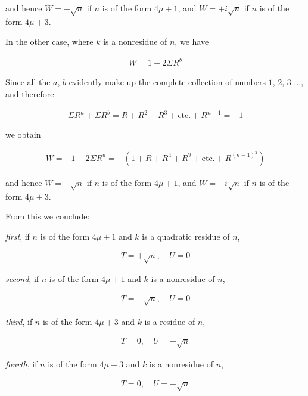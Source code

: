 and hence $W=+\surd n$ if $n$ is of the form $4\mu+1$, and $W=+i\surd n$ if $n$ is of the form $4\mu+3$.

In the other case, where $k$ is a nonresidue of $n$, we have

\[
\begin{aligned}
W=1+2\Sigma R^b
\end{aligned}
\]

Since all the $a$, $b$ evidently make up the complete collection of numbers $1$, $2$, $3$ $\ldots$, and therefore

\[
\begin{aligned}
\Sigma R^a+\Sigma R^b=R+R^2+R^3+\text{etc.}+R^{n-1}=-1
\end{aligned}
\]

we obtain

\[
\begin{aligned}
W=-1-2\Sigma R^a=-(1+R+R^4+R^9+\text{etc.}+R^{(n-1)^2})
\end{aligned}
\]

and hence $W=-\surd n$ if $n$ is of the form $4\mu+1$, and $W=-i\surd n$ if $n$ is of the form $4\mu+3$.

From this we conclude:

\emph{first}, if $n$ is of the form $4\mu+1$ and $k$ is a quadratic residue of $n$,

\[
\begin{aligned}
T=+\surd n,\quad U=0
\end{aligned}
\]

\emph{second}, if $n$ is of the form $4\mu+1$ and $k$ is a nonresidue of $n$,

\[
\begin{aligned}
T=-\surd n,\quad U=0
\end{aligned}
\]

\emph{third}, if $n$ is of the form $4\mu+3$ and $k$ is a residue of $n$,

\[
\begin{aligned}
T=0,\quad U=+\surd n
\end{aligned}
\]

\emph{fourth}, if $n$ is of the form $4\mu+3$ and $k$ is a nonresidue of $n$,

\[
\begin{aligned}
T=0,\quad U=-\surd n
\end{aligned}
\]
